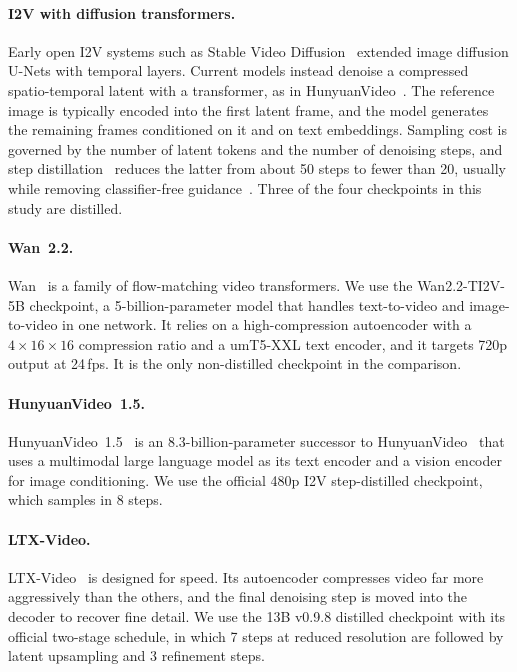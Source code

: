 \documentclass[11pt,a4paper]{article}
\begin{document}
\paragraph{I2V with diffusion transformers.}
Early open I2V systems such as Stable Video Diffusion~\citep{blattmann2023svd} extended image diffusion U-Nets with temporal layers. Current models instead denoise a compressed spatio-temporal latent with a transformer, as in HunyuanVideo~\citep{kong2024hunyuanvideo}. The reference image is typically encoded into the first latent frame, and the model generates the remaining frames conditioned on it and on text embeddings. Sampling cost is governed by the number of latent tokens and the number of denoising steps, and step distillation~\citep{salimans2022progressive} reduces the latter from about 50 steps to fewer than 20, usually while removing classifier-free guidance~\citep{ho2022cfg}. Three of the four checkpoints in this study are distilled.

\paragraph{Wan~2.2.}
Wan~\citep{wan2025} is a family of flow-matching video transformers. We use the Wan2.2-TI2V-5B checkpoint, a 5-billion-parameter model that handles text-to-video and image-to-video in one network. It relies on a high-compression autoencoder with a $4\times16\times16$ compression ratio and a umT5-XXL text encoder, and it targets 720p output at 24\,fps. It is the only non-distilled checkpoint in the comparison.

\paragraph{HunyuanVideo~1.5.}
HunyuanVideo~1.5~\citep{hunyuanvideo15} is an 8.3-billion-parameter successor to HunyuanVideo~\citep{kong2024hunyuanvideo} that uses a multimodal large language model as its text encoder and a vision encoder for image conditioning. We use the official 480p I2V step-distilled checkpoint, which samples in 8 steps.

\paragraph{LTX-Video.}
LTX-Video~\citep{hacohen2024ltx} is designed for speed. Its autoencoder compresses video far more aggressively than the others, and the final denoising step is moved into the decoder to recover fine detail. We use the 13B v0.9.8 distilled checkpoint with its official two-stage schedule, in which 7 steps at reduced resolution are followed by latent upsampling and 3 refinement steps.
\end{document}
